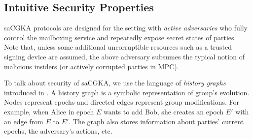 \subsection{Intuitive Security Properties}
saCGKA protocols are designed for the setting with \emph{active adversaries} who fully control the mailboxing service and repeatedly expose secret states of parties. Note that, unless some additional uncorruptible resources such as a trusted signing device are assumed, the above adversary subsumes the typical notion of malicious insiders (or actively corrupted parties in MPC).

To talk about security of saCGKA, we use the language of \emph{history
graphs} introduced in \cite{CCS:ACDT21}. A history graph is a symbolic
representation of group's evolution. Nodes represent epochs and
directed edges represent group modifications. For example, when
Alice in epoch $E$ wants to add Bob, she creates an epoch $E'$ with an edge
from $E$ to $E'$. The graph also stores information about parties' current
epochs, the adversary's actions, etc.


